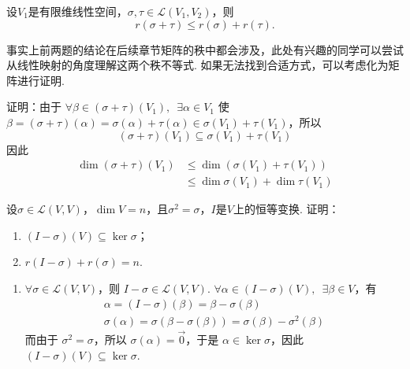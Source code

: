 \begin{exercise}
\begin{exgroup}
        \item 设$V_1$是有限维线性空间，$\sigma,\tau\in \mathcal{L}(V_1,V_2)$，则
        \[r(\sigma+\tau) \leqslant r(\sigma)+r(\tau).\]

        事实上前两题的结论在后续章节矩阵的秩中都会涉及，此处有兴趣的同学可以尝试从线性映射的角度理解这两个秩不等式. 如果无法找到合适方式，可以考虑化为矩阵进行证明.
        \begin{answer}
            证明：由于 $ \forall \beta \in (\sigma + \tau)(V_1),\enspace \exists \alpha \in V_1 $ 使 $ \beta = (\sigma + \tau)(\alpha) = \sigma(\alpha) + \tau(\alpha) \in \sigma(V_1) + \tau(V_1) $，所以
          \[ (\sigma + \tau)(V_1) \subseteq \sigma(V_1) + \tau(V_1) \]
          因此
          \begin{align*}
              \dim(\sigma + \tau)(V_1) & \leqslant \dim(\sigma(V_1) + \tau(V_1))     \\
                                       & \leqslant \dim \sigma(V_1) + \dim \tau(V_1)
          \end{align*}
        \end{answer}
        \item 设$\sigma\in \mathcal{L}(V,V)$，$\dim V=n$，且$\sigma^2=\sigma$，$I$是$V$上的恒等变换. 证明：
        \begin{enumerate}
            \item $(I-\sigma)(V) \subseteq \ker\sigma$；

            \item $r(I-\sigma)+r(\sigma)=n$.
        \end{enumerate}

        \begin{answer}
            \begin{enumerate}
                \item \label{item:5:C:6:1}
                      $ \forall \sigma \in \mathcal{L}(V, V) $，则 $ I - \sigma \in \mathcal{L}(V, V) $. $ \forall \alpha \in (I - \sigma)(V),\enspace \exists \beta \in V $，有
                      \begin{gather*}
                          \alpha = (I - \sigma)(\beta) = \beta - \sigma(\beta) \\
                          \sigma(\alpha) = \sigma(\beta - \sigma(\beta)) = \sigma(\beta) - \sigma^2(\beta)
                      \end{gather*}
                      而由于 $ \sigma^2 = \sigma $，所以 $ \sigma(\alpha) = \vec{0} $，于是 $ \alpha \in \ker \sigma $，因此 $ (I - \sigma)(V) \subseteq \ker \sigma $.


\end{enumerate}
\end{answer}
\end{exgroup}
\end{exercise}
